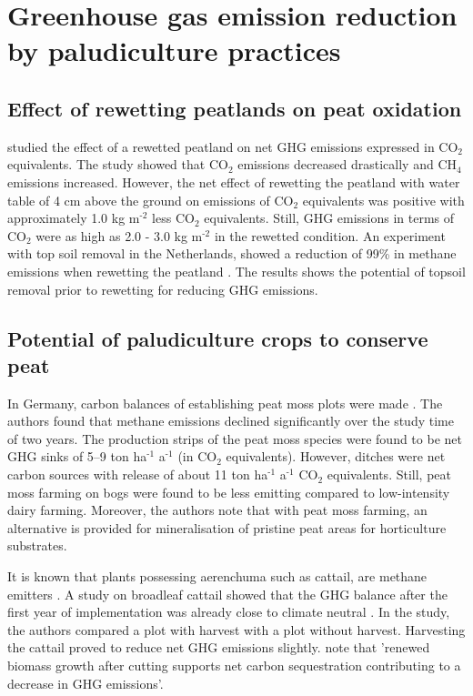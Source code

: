 \documentclass[a4paper,12pt]{scrbook}
\newcommand{\sur}[1]{\ensuremath{^{\textrm{#1}}}}
\newcommand{\sous}[1]{\ensuremath{_{\textrm{#1}}}}
\begin{document}
\section{Greenhouse gas emission reduction by paludiculture practices}

\subsection{Effect of rewetting peatlands on peat oxidation}

\citet{van2013rewetting} studied the effect of a rewetted peatland on net GHG emissions expressed in CO\sous{2} equivalents. The study showed that CO\sous{2} emissions decreased drastically and CH\sous{4} emissions increased. However, the net effect of rewetting the peatland with water table of 4 cm above the ground on emissions of CO\sous{2} equivalents was positive with approximately 1.0 kg m\sur{-2} less CO\sous{2} equivalents. Still, GHG emissions in terms of CO\sous{2} were as high as 2.0 - 3.0 kg m\sur{-2} in the rewetted condition. An experiment with top soil removal in the Netherlands, showed a reduction of 99\% in methane emissions when rewetting the peatland \citep{harpenslager2015rewetting}. The results shows the potential of topsoil removal prior to rewetting for reducing GHG emissions. 

\subsection{Potential of paludiculture crops to conserve peat}
In Germany, carbon balances of establishing peat moss plots were made \citep{gunther2017greenhouse}. The authors found that methane emissions declined significantly over the study time of two years. The production strips of the peat moss  species were found to be net GHG sinks of 5–9 ton ha\sur{-1} a\sur{-1} (in CO\sous{2} equivalents). However, ditches were net carbon sources with release of about 11 ton ha\sur{-1} a\sur{-1} CO\sous{2} equivalents. Still, peat moss farming on bogs were found to be less emitting compared to low-intensity dairy farming. Moreover, the authors note that with peat moss farming, an alternative is provided for mineralisation of pristine peat areas for horticulture substrates.
 
It is known that plants possessing aerenchuma such as cattail, are methane emitters \citep{wichtmann2016paludiculture}. A study on broadleaf cattail showed that the GHG balance after the first year of implementation was already close to climate neutral \citep{guntherghgtypha}. In the study, the authors compared a plot with harvest with a plot without harvest. Harvesting the cattail proved to reduce net GHG emissions slightly. \citet{wichtmann2016paludiculture} note that 'renewed biomass growth after cutting supports net carbon sequestration contributing to a decrease in GHG emissions'. 
\end{document}
